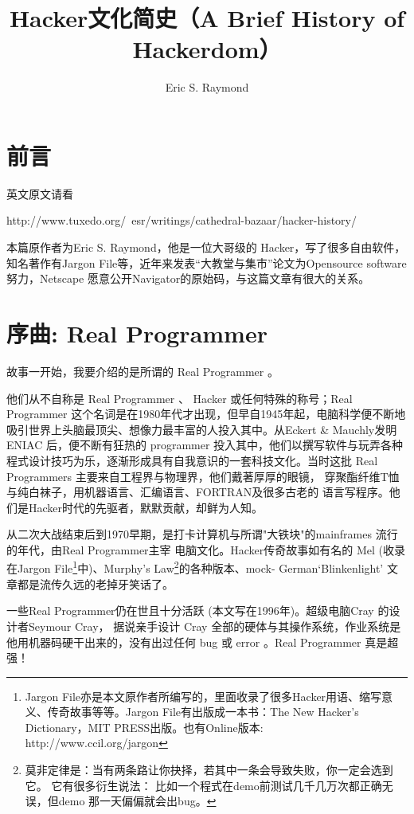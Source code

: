 \documentclass[a4paper,12pt,UTF8,twoside]{ctexbook}
\title{\heiti\zihao{0} Hacker文化简史（A Brief History of  Hackerdom）}
\author{Eric S. Raymond}
\date{}
\begin{document}
\maketitle
\tableofcontents

\frontmatter
\chapter{前言}

英文原文请看

http://www.tuxedo.org/~esr/writings/cathedral-bazaar/hacker-history/

本篇原作者为Eric S. Raymond，他是一位大哥级的 Hacker，写了很多自由软件，知名著作有Jargon File等，近年来发表“大教堂与集市”论文为Opensource software努力，Netscape 愿意公开Navigator的原始码，与这篇文章有很大的关系。

\mainmatter

\chapter{序曲: Real Programmer}

故事一开始，我要介绍的是所谓的 Real Programmer 。

他们从不自称是 Real Programmer 、 Hacker 或任何特殊的称号；Real Programmer 这个名词是在1980年代才出现，但早自1945年起，电脑科学便不断地吸引世界上头脑最顶尖、想像力最丰富的人投入其中。从Eckert \& Mauchly发明ENIAC 后，便不断有狂热的 programmer 投入其中，他们以撰写软件与玩弄各种程式设计技巧为乐，逐渐形成具有自我意识的一套科技文化。当时这批 Real Programmers 主要来自工程界与物理界，他们戴著厚厚的眼镜， 穿聚酯纤维T恤与纯白袜子，用机器语言、汇编语言、FORTRAN及很多古老的 语言写程序。他们是Hacker时代的先驱者，默默贡献，却鲜为人知。

从二次大战结束后到1970早期，是打卡计算机与所谓"大铁块"的mainframes 流行的年代，由Real Programmer主宰
电脑文化。Hacker传奇故事如有名的 Mel (收录在Jargon File\footnote{Jargon File亦是本文原作者所编写的，里面收录了很多Hacker用语、缩写意义、传奇故事等等。Jargon File有出版成一本书：The New Hacker's Dictionary，MIT PRESS出版。也有Online版本: http://www.ccil.org/jargon}中)、Murphy's Law\footnote{莫非定律是：当有两条路让你抉择，若其中一条会导致失败，你一定会选到它。 它有很多衍生说法： 比如一个程式在demo前测试几千几万次都正确无误，但demo 那一天偏偏就会出bug。}的各种版本、mock- German`Blinkenlight' 文章都是流传久远的老掉牙笑话了。

一些Real Programmer仍在世且十分活跃 (本文写在1996年)。超级电脑Cray 的设计者Seymour Cray， 据说亲手设计 Cray 全部的硬体与其操作系统，作业系统是他用机器码硬干出来的，没有出过任何 bug 或 error 。Real Programmer 真是超强！
\end{document}

